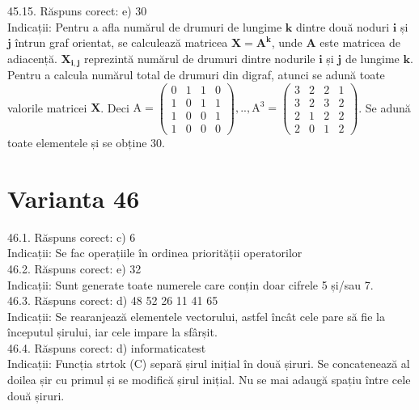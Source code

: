 45.15. Răspuns corect: e) 30\\
Indicații: Pentru a afla numărul de drumuri de lungime $\mathbf{k}$ dintre două noduri $\mathbf{i}$ și $\mathbf{j}$ întrun graf orientat, se calculează matricea $\mathbf{X}=\mathbf{A}^{\mathbf{k}}$, unde $\mathbf{A}$ este matricea de adiacență. $\mathbf{X}_{\mathbf{i}, \boldsymbol{j}}$ reprezintă numărul de drumuri dintre nodurile $\mathbf{i}$ și $\mathbf{j}$ de lungime $\mathbf{k}$. Pentru a calcula numărul total de drumuri din digraf, atunci se adună toate valorile matricei $\mathbf{X}$. Deci
$\mathrm{A}=\left(\begin{array}{llll}0 & 1 & 1 & 0 \\ 1 & 0 & 1 & 1 \\ 1 & 0 & 0 & 1 \\ 1 & 0 & 0 & 0\end{array}\right), . ., \mathrm{A}^{3}=\left(\begin{array}{llll}3 & 2 & 2 & 1 \\ 3 & 2 & 3 & 2 \\ 2 & 1 & 2 & 2 \\ 2 & 0 & 1 & 2\end{array}\right)$. Se adună toate elementele și se obține 30.\\

\section*{Varianta 46}

46.1. Răspuns corect: c) 6\\
Indicații: Se fac operațiile în ordinea priorităț̦ii operatorilor\\

46.2. Răspuns corect: e) 32\\
Indicații: Sunt generate toate numerele care conțin doar cifrele 5 și/sau 7.\\

46.3. Răspuns corect: d) 48 52 26 11 41 65\\
Indicații: Se rearanjează elementele vectorului, astfel încât cele pare să fie la începutul șirului, iar cele impare la sfârșit.\\

46.4. Răspuns corect: d) informaticatest\\
Indicații: Funcția strtok (C) separă șirul inițial în două șiruri. Se concatenează al doilea șir cu primul și se modifică șirul inițial. Nu se mai adaugă spațiu între cele două șiruri.\\

